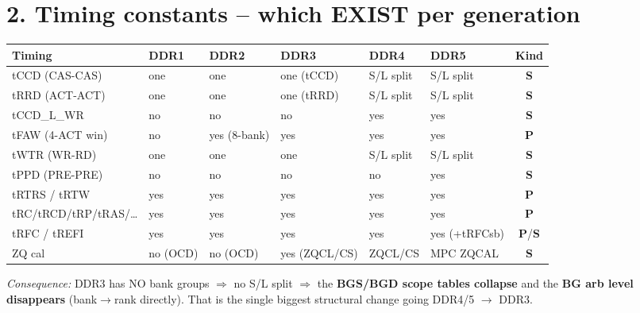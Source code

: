 \documentclass[10pt]{article}
\renewcommand{\P}{\textbf{\textcolor{para}{P}}}
\newcommand{\Su}{\textbf{\textcolor{stru}{S}}}
\begin{document}
\section*{2. Timing constants -- which EXIST per generation}
{\scriptsize
\begin{longtable}{>{\raggedright\arraybackslash}p{2.7cm} p{1.8cm} p{1.8cm} p{1.9cm} p{2.0cm} p{2.2cm} c}
\toprule
\textbf{Timing} & \textbf{DDR1} & \textbf{DDR2} & \textbf{DDR3} & \textbf{DDR4} & \textbf{DDR5} & \textbf{Kind}\\
\midrule\endhead
tCCD (CAS-CAS)   & one      & one          & one (tCCD)    & S/L split     & S/L split     & \Su\\
tRRD (ACT-ACT)   & one      & one          & one (tRRD)    & S/L split     & S/L split     & \Su\\
tCCD\_L\_WR      & no       & no           & no            & yes           & yes           & \Su\\
tFAW (4-ACT win) & no       & yes (8-bank) & yes           & yes           & yes           & \P\\
tWTR (WR-RD)     & one      & one          & one           & S/L split     & S/L split     & \Su\\
tPPD (PRE-PRE)   & no       & no           & no            & no            & yes           & \Su\\
tRTRS / tRTW     & yes      & yes          & yes           & yes           & yes           & \P\\
tRC/tRCD/tRP/tRAS/\dots & yes & yes        & yes           & yes           & yes           & \P\\
tRFC / tREFI     & yes      & yes          & yes           & yes           & yes (+tRFCsb) & \P/\Su\\
ZQ cal           & no (OCD) & no (OCD)     & yes (ZQCL/CS) & ZQCL/CS       & MPC ZQCAL     & \Su\\
\bottomrule
\end{longtable}
\emph{Consequence:} DDR3 has NO bank groups $\Rightarrow$ no S/L split $\Rightarrow$ the
\textbf{BGS/BGD scope tables collapse} and the \textbf{BG arb level disappears} (bank$\to$rank
directly). That is the single biggest structural change going DDR4/5 $\rightarrow$ DDR3.}
\end{document}
